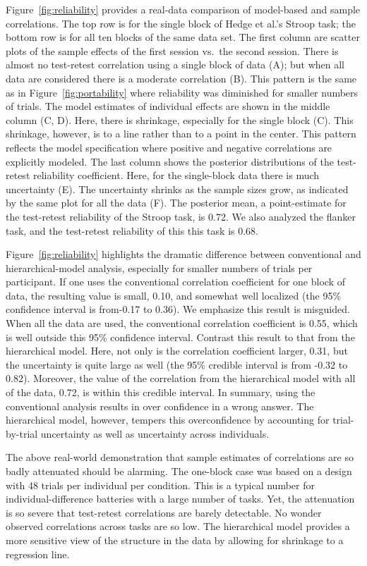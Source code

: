 \documentclass[english,man]{apa6}
\theoremstyle{definition}
\theoremstyle{definition}
\theoremstyle{definition}
\theoremstyle{remark}
\begin{document}
Figure~\ref{fig:reliability} provides a real-data comparison of
model-based and sample correlations. The top row is for the single block
of Hedge et al.'s Stroop task; the bottom row is for all ten blocks of
the same data set. The first column are scatter plots of the sample
effects of the first session vs.~the second session. There is almost no
test-retest correlation using a single block of data (A); but when all
data are considered there is a moderate correlation (B). This pattern is
the same as in Figure~\ref{fig:portability} where reliability was
diminished for smaller numbers of trials. The model estimates of
individual effects are shown in the middle column (C, D). Here, there is
shrinkage, especially for the single block (C). This shrinkage, however,
is to a line rather than to a point in the center. This pattern reflects
the model specification where positive and negative correlations are
explicitly modeled. The last column shows the posterior distributions of
the test-retest reliability coefficient. Here, for the single-block data
there is much uncertainty (E). The uncertainty shrinks as the sample
sizes grow, as indicated by the same plot for all the data (F). The
posterior mean, a point-estimate for the test-retest reliability of the
Stroop task, is 0.72. We also analyzed the flanker task, and the
test-retest reliability of this this task is 0.68.

Figure~\ref{fig:reliability} highlights the dramatic difference between
conventional and hierarchical-model analysis, especially for smaller
numbers of trials per participant. If one uses the conventional
correlation coefficient for one block of data, the resulting value is
small, 0.10, and somewhat well localized (the 95\% confidence interval
is from-0.17 to 0.36). We emphasize this result is misguided. When all
the data are used, the conventional correlation coefficient is 0.55,
which is well outside this 95\% confidence interval. Contrast this
result to that from the hierarchical model. Here, not only is the
correlation coefficient larger, 0.31, but the uncertainty is quite large
as well (the 95\% credible interval is from -0.32 to 0.82). Moreover,
the value of the correlation from the hierarchical model with all of the
data, 0.72, is within this credible interval. In summary, using the
conventional analysis results in over confidence in a wrong answer. The
hierarchical model, however, tempers this overconfidence by accounting
for trial-by-trial uncertainty as well as uncertainty across
individuals.

The above real-world demonstration that sample estimates of correlations
are so badly attenuated should be alarming. The one-block case was based
on a design with 48 trials per individual per condition. This is a
typical number for individual-difference batteries with a large number
of tasks. Yet, the attenuation is so severe that test-retest
correlations are barely detectable. No wonder observed correlations
across tasks are so low. The hierarchical model provides a more
sensitive view of the structure in the data by allowing for shrinkage to
a regression line.
\end{document}
